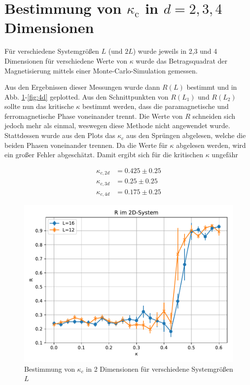 \documentclass[10pt,a4paper]{article}
\begin{document}
\section{Bestimmung von $\kappa_\text{c}$ in $d=2,3,4$ Dimensionen}

Für verschiedene Systemgrößen $L$ (und $2L$) wurde jeweils in 2,3 und 4 Dimensionen für verschiedene
Werte von $\kappa$ wurde das Betragsquadrat der Magnetisierung mittels
einer Monte-Carlo-Simulation gemessen.

Aus den Ergebnissen dieser Messungen wurde dann $R(L)$ bestimmt und in
Abb. \ref{fig:2d}-\ref{fig:4d} geplotted.
Aus den Schnittpunkten von $R(L_1)$ und $R(L_2)$ sollte nun das kritische $\kappa$
bestimmt werden, dass die paramagnetische und ferromagnetische Phase voneinander
trennt. Die Werte von $R$ schneiden sich jedoch mehr als einmal, weswegen diese
Methode nicht angewendet wurde. Stattdessen wurde aus den Plots das $\kappa_c$
aus den Sprüngen abgelesen, welche die beiden Phasen voneinander trennen.
Da die Werte für $\kappa$ abgelesen werden, wird ein großer Fehler abgeschätzt.
\newpage
Damit ergibt sich für die kritischen $\kappa$ ungefähr

\begin{align*}
  \kappa_{c,2d} &= 0.425 \pm 0.25 \\
  \kappa_{c,3d} &= 0.25 \pm 0.25\\
  \kappa_{c,4d} &= 0.175 \pm 0.25
\end{align*}


\begin{figure}
  \centering
  \includegraphics[width=\textwidth]{../figures/2dR.pdf}
  \caption{Bestimmung von $\kappa_c$ in 2 Dimensionen für verschiedene Systemgrößen $L$}\label{fig:2d}
\end{figure}
\end{document}
